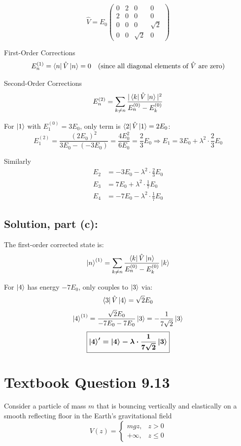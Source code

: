 \documentclass[12pt]{article}
\begin{document}
        \[
            \hat{V} = E_0 
            \begin{pmatrix}
                0 & 2 & 0 & 0 \\
                2 & 0 & 0 & 0 \\
                0 & 0 & 0 & \sqrt{2} \\
                0 & 0 & \sqrt{2} & 0
            \end{pmatrix}
        \]

        First-Order Corrections
        \[
            E_n^{(1)} = \bra{n} \hat{V} \ket{n} = 0 \quad \text{(since all diagonal elements of } \hat{V} \text{ are zero)}
        \]

        Second-Order Corrections
        \[
            E_n^{(2)} = \sum_{k \neq n} \frac{|\bra{k} \hat{V} \ket{n}|^2}{E_n^{(0)} - E_k^{(0)}}
        \]

        For \( \ket{1} \) with \( E_1^{(0)} = 3E_0 \), only term is \( \bra{2} \hat{V} \ket{1} = 2E_0 \):
        \[
            E_1^{(2)} = \frac{(2E_0)^2}{3E_0 - (-3E_0)} = \frac{4E_0^2}{6E_0} = \frac{2}{3}E_0
            \Rightarrow E_1 = 3E_0 + \lambda^2 \cdot \frac{2}{3}E_0
        \]

        Similarly
        \[
            \begin{aligned}
                E_2 &= -3E_0 - \lambda^2 \cdot \frac{2}{3}E_0 \\
                E_3 &= 7E_0 + \lambda^2 \cdot \frac{1}{7}E_0 \\
                E_4 &= -7E_0 - \lambda^2 \cdot \frac{1}{7}E_0
            \end{aligned}
        \]

    \subsection{Solution, part (c):}
        The first-order corrected state is:
        \[
            \ket{n}^{(1)} = \sum_{k \neq n} \frac{\bra{k} \hat{V} \ket{n}}{E_n^{(0)} - E_k^{(0)}} \ket{k}
        \]

        For \( \ket{4} \) has energy \( -7E_0 \), only couples to \( \ket{3} \) via:
        \[
            \bra{3} \hat{V} \ket{4} = \sqrt{2}E_0
        \]
        \[
            \ket{4}^{(1)} = \frac{\sqrt{2}E_0}{-7E_0 - 7E_0} \ket{3} = -\frac{1}{7\sqrt{2}} \ket{3}
        \]
        \[
            \boldsymbol{\boxed{\ket{4}' = \ket{4} - \lambda \cdot \frac{1}{7\sqrt{2}} \ket{3}}}
        \]


\section{Textbook Question 9.13}
    Consider a particle of mass \( m \) that is bouncing vertically and elastically on a smooth reflecting floor in the Earth's gravitational field
    \[
        V(z) = 
        \begin{cases}
            mgz, & z > 0 \\
            +\infty, & z \leq 0
        \end{cases}
    \]
\end{document}
